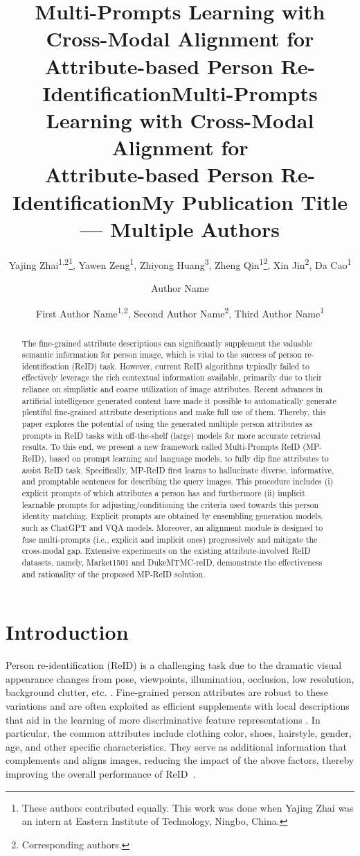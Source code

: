 \documentclass[letterpaper]{article} %
\title{Multi-Prompts Learning with Cross-Modal Alignment for\\
Attribute-based Person Re-Identification}
\author{
    Yajing Zhai\textsuperscript{\rm 1,2}\thanks{These authors contributed equally. This work was done when Yajing Zhai was an intern at Eastern Institute of Technology, Ningbo, China.},
    Yawen Zeng\textsuperscript{\rm 1}\footnotemark[1],
    Zhiyong Huang\textsuperscript{\rm 3},
    Zheng Qin\textsuperscript{\rm 1}\thanks{Corresponding authors.},
    Xin Jin\textsuperscript{\rm 2}\footnotemark[2],
    Da Cao\textsuperscript{\rm 1}
}
\title{Multi-Prompts Learning with Cross-Modal Alignment for\\
Attribute-based Person Re-Identification}
\author {
    Author Name
}
\title{My Publication Title --- Multiple Authors}
\author {
    First Author Name\textsuperscript{\rm 1,\rm 2},
    Second Author Name\textsuperscript{\rm 2},
    Third Author Name\textsuperscript{\rm 1}
}
\begin{document}
\maketitle

\begin{abstract}
The fine-grained attribute descriptions can significantly supplement the valuable semantic information for person image, which is vital to the success of person re-identification (ReID) task. However, current ReID algorithms typically failed to effectively leverage the rich contextual information available, primarily due to their reliance on simplistic and coarse utilization of image attributes. Recent advances in artificial intelligence generated content have made it possible to automatically generate plentiful fine-grained attribute descriptions and make full use of them. Thereby, this paper explores the potential of using the generated multiple person attributes as prompts in ReID tasks with off-the-shelf (large) models for more accurate retrieval results. To this end, we present a new framework called Multi-Prompts ReID (MP-ReID), based on prompt learning and language models, to fully dip fine attributes to assist ReID task. Specifically, MP-ReID first learns to hallucinate diverse, informative, and promptable sentences for describing the query images. This procedure includes (i) explicit prompts of which attributes a person has and furthermore (ii) implicit learnable prompts for adjusting/conditioning the criteria used towards this person identity matching. Explicit prompts are obtained by ensembling generation models, such as ChatGPT and VQA models. Moreover, an alignment module is designed to fuse multi-prompts (i.e., explicit and implicit ones) progressively and mitigate the cross-modal gap. Extensive experiments on the existing attribute-involved ReID datasets, namely, Market1501 and DukeMTMC-reID, demonstrate the effectiveness and rationality of the proposed MP-ReID solution.
\end{abstract}

\section{Introduction}

Person re-identification (ReID) is a challenging task due to the dramatic visual appearance changes from pose, viewpoints, illumination, occlusion, low resolution, background clutter, etc. \cite{jin2020uncertainty,ye2021deep,zhang2021person}. Fine-grained person attributes are robust to these variations and are often exploited as efficient supplements with local descriptions that aid in the learning of more discriminative feature representations \cite{jia2022learning,wang2022pedestrian}. In particular, the common attributes include clothing color, shoes, hairstyle, gender, age, and other specific characteristics. They serve as additional information that complements and aligns images, reducing the impact of the above factors, thereby improving the overall performance of ReID~\cite{yu2022multi}. 
\end{document}
